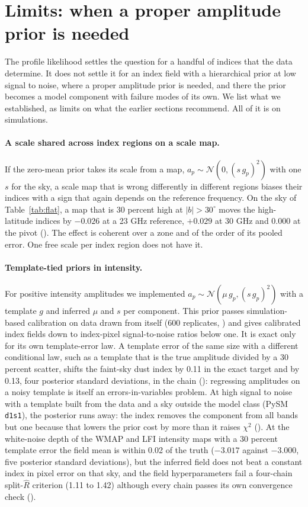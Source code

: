 \section{Limits: when a proper amplitude prior is needed}
\label{sec:limits}

The profile likelihood settles the question for a handful of indices that the data determine. It
does not settle it for an index field with a hierarchical prior at low signal to noise, where a
proper amplitude prior is needed, and there the prior becomes a model component with failure modes
of its own. We list what we established, as limits on what the earlier sections recommend. All of it
is on simulations.

\paragraph{A scale shared across index regions on a scale map.} If the zero-mean prior takes its
scale from a map, $a_p \sim \mathcal{N}(0, (s\,g_p)^2)$ with one $s$ for the sky, a scale map that is
wrong differently in different regions biases their indices with a sign that again depends on the
reference frequency. On the sky of Table~\ref{tab:flat}, a map that is 30 percent high at
$|b| > 30^\circ$ moves the high-latitude indices by $-0.026$ at a 23 GHz reference, $+0.029$ at 30 GHz
and $0.000$ at the pivot (). The effect is coherent over a zone and of the order of its
pooled error. One free scale per index region does not have it.

\paragraph{Template-tied priors in intensity.} For positive intensity amplitudes we implemented
$a_p \sim \mathcal{N}(\mu\, g_p, (s\, g_p)^2)$ with a template $g$ and inferred $\mu$ and $s$ per
component. This prior passes simulation-based calibration on data drawn from itself (600
replicates, ) and gives calibrated index fields down to index-pixel signal-to-noise
ratios below one. It is exact only for its own template-error law. A template error of the same
size with a different conditional law, such as a template that is the true amplitude divided by a
30 percent scatter, shifts the faint-sky dust index by 0.11 in the exact target and by 0.13, four
posterior standard deviations, in the chain (): regressing amplitudes on a noisy template is itself an errors-in-variables problem.
At high signal to noise with a template built from the data and a sky outside the model class
(PySM \texttt{d1s1}), the posterior runs away: the index removes the component from all bands but
one because that lowers the prior cost by more than it raises $\chi^2$ (). At the
white-noise depth of the WMAP and LFI intensity maps with a 30 percent template error the field mean
is within 0.02 of the truth ($-3.017$ against $-3.000$, five posterior standard deviations), but the
inferred field does not beat a constant index in
pixel error on that sky, and the field hyperparameters fail a four-chain split-$\hat R$ criterion
(1.11 to 1.42) although every chain passes its own convergence check ().

